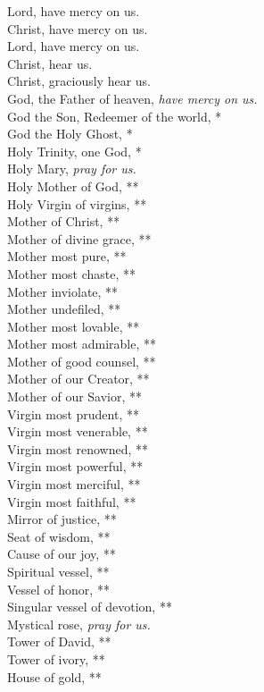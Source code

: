 \documentclass{article}
\begin{document}
\begin{multicols}{3}
\begin{FlushLeft}
Lord, have mercy on us.\\
Christ, have mercy on us.\\
Lord, have mercy on us.\\
Christ, hear us.\\
Christ, graciously hear us.\\
God, the Father of heaven, \textit{have mercy on us.}\\
God the Son, Redeemer of the world, *\\
God the Holy Ghost, *\\
Holy Trinity, one God, *\\
Holy Mary, \textit{pray for us.}\\
Holy Mother of God, **\\
Holy Virgin of virgins, **\\
Mother of Christ, **\\
Mother of divine grace, **\\
Mother most pure, **\\
Mother most chaste, **\\
Mother inviolate, **\\
Mother undefiled, **\\
Mother most lovable, **\\
Mother most admirable, **\\
Mother of good counsel, **\\
Mother of our Creator, **\\
Mother of our Savior, **\\
Virgin most prudent, **\\
Virgin most venerable, **\\
Virgin most renowned, **\\
Virgin most powerful, **\\
Virgin most merciful, **\\
Virgin most faithful, **\\
Mirror of justice, **\\
Seat of wisdom, **\\
Cause of our joy, **\\
Spiritual vessel, **\\
Vessel of honor, **\\
Singular vessel of devotion, **\\
Mystical rose, \textit{pray for us.}\\
Tower of David, **\\
Tower of ivory, **\\
House of gold, **\\

\end{FlushLeft}
\end{multicols}
\end{document}
